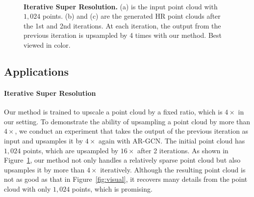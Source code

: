 \documentclass[10pt,twocolumn,letterpaper]{article}
\begin{document}
\begin{figure}
\captionsetup[subfigure]{labelformat=empty}
\begin{center}
    \hfill
	\hfill
	\\
	\hfill
	\hfill
\end{center}
	\vspace{-1.5em}
	\caption{\textbf{Iterative Super Resolution.} (a) is the input point cloud with $1,024$ points. (b) and (c) are the generated HR point clouds after the 1st and 2nd iterations. At each iteration, the output from the previous iteration is upsampled by 4 times with our method. Best viewed in color.}
	\vspace{-1em}
	\label{fig:iterative}
\end{figure}

\subsection{Applications}
\paragraph{Iterative Super Resolution}
Our method is trained to upscale a point cloud by a fixed ratio, which is $4\times$ in our setting.
To demonstrate the ability of upsampling a point cloud by more than $4\times$, we conduct an experiment that takes the output of the previous iteration as input and upsamples it by $4\times$ again with AR-GCN.
The initial point cloud has $1,024$ points, which are upsampled by $16\times$ after 2 iterations.
As shown in Figure~\ref{fig:iterative}, our method not only handles a relatively sparse point cloud but also upsamples it by more than $4\times$ iteratively.
Although the resulting point cloud is not as good as that in Figure~\ref{fig:visual}, it recovers many details from the point cloud with only $1,024$ points, which is promising.

\vspace{-1em}
\end{document}
